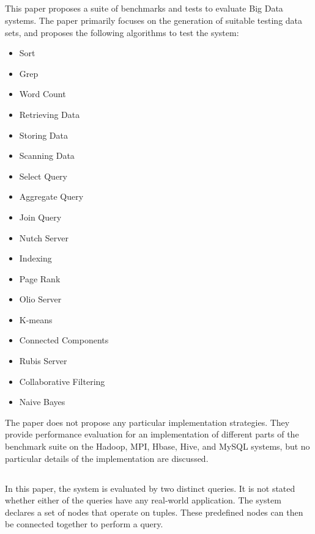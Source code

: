 \subsection{}
This paper proposes a suite of benchmarks and tests to evaluate Big Data systems. The paper primarily focuses on the generation of suitable testing data sets, and proposes the following algorithms to test the system:

\begin{multicols}{2}
\begin{itemize}
\item Sort
\item Grep
\item Word Count
\item Retrieving Data
\item Storing Data
\item Scanning Data
\item Select Query
\item Aggregate Query
\item Join Query
\item Nutch Server
\item Indexing
\item Page Rank
\item Olio Server
\item K-means
\item Connected Components
\item Rubis Server
\item Collaborative Filtering
\item Naive Bayes
\end{itemize}
\end{multicols}

The paper does not propose any particular implementation strategies. They provide performance evaluation for an implementation of different parts of the benchmark suite on the Hadoop, MPI, Hbase, Hive, and MySQL systems, but no particular details of the implementation are discussed.

\subsection{}
In this paper, the system is evaluated by two distinct queries. It is not stated whether either of the queries have any real-world application. The system declares a set of nodes that operate on tuples. These predefined nodes can then be connected together to perform a query. \\

